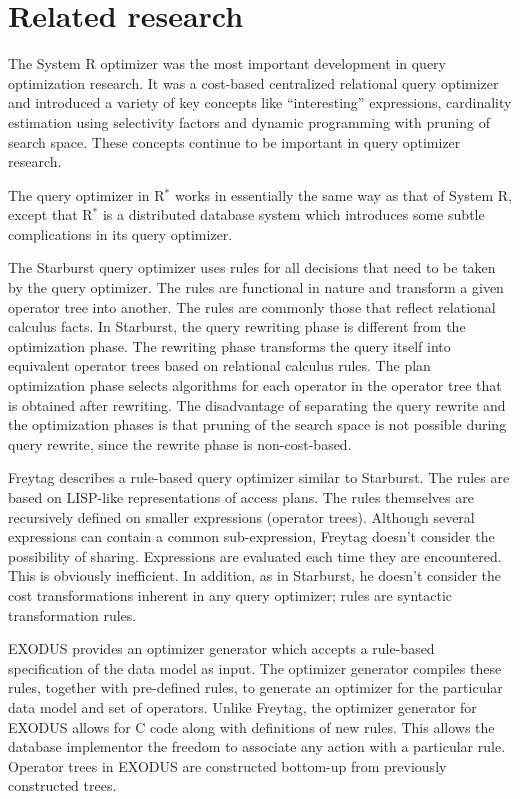 \section{Related research}
\label{sec:related}

The System R optimizer \cite{Seli79} was the most important development
in query optimization research.  It was a cost-based centralized
relational query optimizer and introduced a variety of key concepts
like ``interesting'' expressions, cardinality estimation using
selectivity factors and dynamic programming with pruning of search
space.  These concepts continue to be important in query optimizer
research.

The query optimizer in R$^*$ \cite{Dani82} works in essentially
the same way as that of System R, except that R$^*$ is a distributed
database system which introduces some subtle complications in its query
optimizer.

The Starburst query optimizer \cite{Haas88} uses rules for all
decisions that need to be taken by the query optimizer.  The rules are
functional in nature and transform a given operator tree into another.
The rules are commonly those that reflect relational calculus facts.
In Starburst, the query rewriting phase is different from the
optimization phase.  The rewriting phase transforms the query itself
into equivalent operator trees based on relational calculus rules.  The
plan optimization phase selects algorithms for each operator in the
operator tree that is obtained after rewriting.  The disadvantage of
separating the query rewrite and the optimization phases is that
pruning of the search space is not possible during query rewrite, since
the rewrite phase is non-cost-based.

Freytag \cite{Frey87a} describes a rule-based query optimizer similar
to Starburst.  The rules are based on LISP-like representations of
access plans.  The rules themselves are recursively defined on smaller
expressions (operator trees).  Although several expressions can contain
a common sub-expression, Freytag doesn't consider the possibility of
sharing.  Expressions are evaluated each time they are encountered.
This is obviously inefficient.  In addition, as in Starburst, he
doesn't consider the cost transformations inherent in any query
optimizer; rules are syntactic transformation rules.

EXODUS \cite{Grae87b} provides an optimizer generator which accepts a
rule-based specification of the data model as input.  The optimizer
generator compiles these rules, together with pre-defined rules, to
generate an optimizer for the particular data model and set of
operators.  Unlike Freytag, the optimizer generator for EXODUS allows
for C code along with definitions of new rules.  This allows the
database implementor the freedom to associate any action with a
particular rule.  Operator trees in EXODUS are constructed bottom-up
from previously constructed trees.

